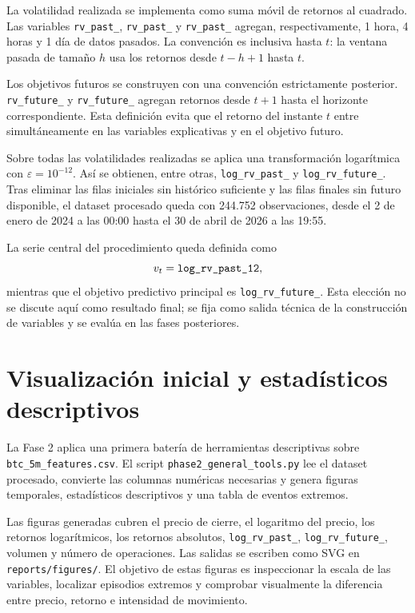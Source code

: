 La volatilidad realizada se implementa como suma móvil de retornos al cuadrado. Las variables \texttt{rv\_\allowbreak past\_}, \texttt{rv\_\allowbreak past\_} y \texttt{rv\_\allowbreak past\_} agregan, respectivamente, 1 hora, 4 horas y 1 día de datos pasados. La convención es inclusiva hasta \(t\): la ventana pasada de tamaño \(h\) usa los retornos desde \(t-h+1\) hasta \(t\).

Los objetivos futuros se construyen con una convención estrictamente posterior. \texttt{rv\_\allowbreak future\_} y \texttt{rv\_\allowbreak future\_} agregan retornos desde \(t+1\) hasta el horizonte correspondiente. Esta definición evita que el retorno del instante \(t\) entre simultáneamente en las variables explicativas y en el objetivo futuro.

Sobre todas las volatilidades realizadas se aplica una transformación logarítmica con \(\varepsilon=10^{-12}\). Así se obtienen, entre otras, \texttt{log\_\allowbreak rv\_\allowbreak past\_} y \texttt{log\_\allowbreak rv\_\allowbreak future\_}. Tras eliminar las filas iniciales sin histórico suficiente y las filas finales sin futuro disponible, el dataset procesado queda con 244.752 observaciones, desde el 2 de enero de 2024 a las 00:00 hasta el 30 de abril de 2026 a las 19:55.

La serie central del procedimiento queda definida como
\[
    v_t = \texttt{log\_\allowbreak rv\_\allowbreak past\_\allowbreak 12},
\]
mientras que el objetivo predictivo principal es \texttt{log\_\allowbreak rv\_\allowbreak future\_}. Esta elección no se discute aquí como resultado final; se fija como salida técnica de la construcción de variables y se evalúa en las fases posteriores.

\section{Visualización inicial y estadísticos descriptivos}\label{sec:visualizacion-descriptivos}

La Fase 2 aplica una primera batería de herramientas descriptivas sobre \texttt{btc\_\allowbreak 5m\_\allowbreak features.csv}. El script \texttt{phase2\_\allowbreak general\_\allowbreak tools.py} lee el dataset procesado, convierte las columnas numéricas necesarias y genera figuras temporales, estadísticos descriptivos y una tabla de eventos extremos.

Las figuras generadas cubren el precio de cierre, el logaritmo del precio, los retornos logarítmicos, los retornos absolutos, \texttt{log\_\allowbreak rv\_\allowbreak past\_}, \texttt{log\_\allowbreak rv\_\allowbreak future\_}, volumen y número de operaciones. Las salidas se escriben como SVG en \texttt{reports/\allowbreak figures/}. El objetivo de estas figuras es inspeccionar la escala de las variables, localizar episodios extremos y comprobar visualmente la diferencia entre precio, retorno e intensidad de movimiento.

